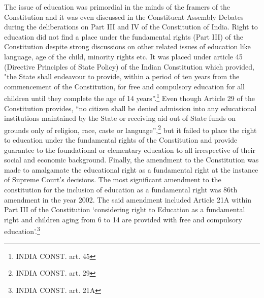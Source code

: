 \begin{multicols}{2}
\vspace{-.1cm}


\vspace{-.1cm}

\noi
The issue of education was primordial in the minds of the framers of the Constitution and it
was even discussed in the Constituent Assembly Debates during the deliberations on Part III
and IV of the Constitution of India. Right to education did not find a place under the
fundamental rights (Part III) of the Constitution despite strong discussions on other related
issues of education like language, age of the child, minority rights etc. It was placed under
article 45 (Directive Principles of State Policy) of the Indian Constitution which provided,
"the State shall endeavour to provide, within a period of ten years from the commencement of
the Constitution, for free and compulsory education for all children until they complete the
age of 14 years”.\footnote{INDIA CONST. art. 45} Even though Article 29 of the Constitution provides, “no citizen shall be
denied admission into any educational institutions maintained by the State or receiving aid
out of State funds on grounds only of religion, race, caste or language”,\footnote{INDIA CONST. art. 29} but it failed to place the right to education under the fundamental rights of the Constitution and provide guarantee
to the foundational or elementary education to all irrespective of their social and economic
background. Finally, the amendment to the Constitution was made to amalgamate the
educational right as a fundamental right at the instance of Supreme Court’s decisions. The
most significant amendment to the constitution for the inclusion of education as a
fundamental right was 86th amendment in the year 2002. The said amendment included
Article 21A within Part III of the Constitution ‘considering right to Education as a
fundamental right and children aging from 6 to 14 are provided with free and compulsory
education’.\footnote{INDIA CONST. art. 21A}

\vspace{-.1cm}


\vspace{-.1cm}


\end{multicols}
